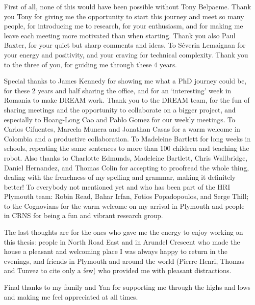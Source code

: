 First of all, none of this would have been possible without Tony Belpaeme. Thank you Tony for giving me the opportunity to start this journey and meet so many people, for introducing me to research, for your enthusiasm, and for making me leave each meeting more motivated than when starting. Thank you also Paul Baxter, for your quiet but sharp comments and ideas. To S\'{e}verin Lemaignan for your energy and positivity, and your craving for technical complexity. Thank you to the three of you, for guiding me through these 4 years.

Special thanks to James Kennedy for showing me what a PhD journey could be, for these 2 years and half sharing the office, and for an `interesting' week in Romania to make DREAM work. Thank you to the DREAM team, for the fun of sharing meetings and the opportunity to collaborate on a bigger project, and especially to Hoang-Long Cao and Pablo Gomez for our weekly meetings. To Carlos Cifuentes, Marcela Munera and Jonathan Casas for a warm welcome in Colombia and a productive collaboration. To Madeleine Bartlett for long weeks in schools, repeating the same sentences to more than 100 children and teaching the robot. Also thanks to Charlotte Edmunds, Madeleine Bartlett, Chris Wallbridge, Daniel Hernandez, and Thomas Colin for accepting to proofread the whole thing, dealing with the frenchness of my spelling and grammar, making it definitely better! To everybody not mentioned yet and who has been part of the HRI Plymouth team: Robin Read, Bahar Irfan, Fotios Popadopoulos, and Serge Thill; to the Cognovians for the warm welcome on my arrival in Plymouth and people in CRNS for being a fun and vibrant research group.

The last thoughts are for the ones who gave me the energy to enjoy working on this thesis: people in North Road East and in Arundel Crescent who made the house a pleasant and welcoming place I was always happy to return in the evenings, and friends in Plymouth and around the world (Pierre-Henri, Thomas and Tunvez to cite only a few) who provided me with pleasant distractions.

Final thanks to my family and Yan for supporting me through the highs and lows and making me feel appreciated at all times.